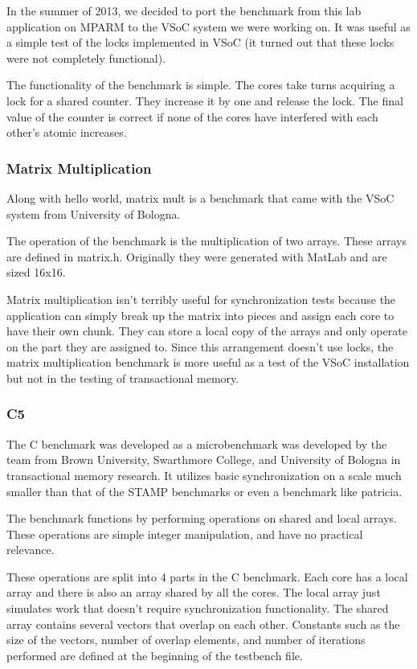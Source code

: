 \documentclass{article}
\begin{document}
In the summer of 2013, we decided to port the benchmark from this lab 
application on MPARM to the VSoC system we were working on.  It was useful as 
a simple test of the locks implemented in VSoC (it turned out that these locks 
were not completely functional).

The functionality of the benchmark is simple. The cores take turns acquiring a 
lock for a shared counter. They increase it by one and release the lock. The 
final value of the counter is correct if none of the cores have interfered 
with each other's atomic increases.

\subsubsection{Matrix Multiplication}

Along with hello world, matrix mult is a benchmark that came with the VSoC 
system from University of Bologna. 

The operation of the benchmark is the multiplication of two arrays. These 
arrays are defined in matrix.h. Originally they were generated with MatLab and 
are sized 16x16. 

Matrix multiplication isn't terribly useful for synchronization tests because 
the application can simply break up the matrix into pieces and assign each 
core to have their own chunk.  They can store a local copy of the arrays and 
only operate on the part they are assigned to. Since this arrangement doesn't 
use locks, the matrix multiplication benchmark is more useful as a test of the 
VSoC installation but not in the testing of transactional memory. 

\subsubsection{C5}

The C benchmark was developed as a microbenchmark was developed by the team
from Brown University, Swarthmore College, and University of Bologna in 
transactional memory research. It utilizes basic synchronization on a scale 
much smaller than that of the STAMP benchmarks or even a benchmark like 
patricia.

The benchmark functions by performing operations on shared and local arrays. 
These operations are simple integer manipulation, and have no practical 
relevance. 

These operations are split into 4 parts in the C benchmark. Each core has a 
local array and there is also an array shared by all the cores. The local 
array just simulates work that doesn't require synchronization functionality. 
The shared array contains several vectors that overlap on each other. 
Constants such as the size of the vectors, number of overlap elements, and 
number of iterations performed are defined at the beginning of the testbench
 file. 
\end{document}
